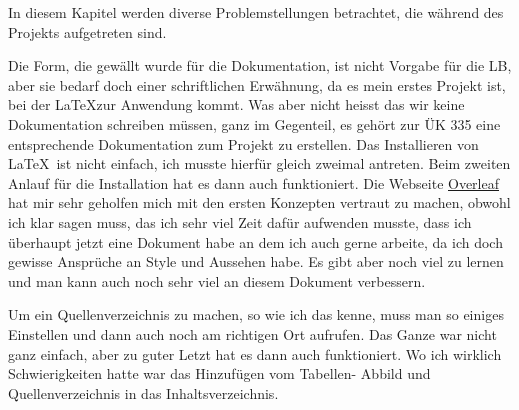 
\label{problemstellung}
In diesem Kapitel werden diverse Problemstellungen betrachtet, die während des Projekts aufgetreten sind.

Die Form, die gewällt wurde für die Dokumentation, ist nicht Vorgabe für die LB,
aber sie bedarf doch einer schriftlichen Erwähnung, da es mein erstes Projekt ist,
bei der \LaTeX zur Anwendung kommt. Was aber nicht heisst das wir keine Dokumentation schreiben
müssen, ganz im Gegenteil, es gehört zur ÜK 335 eine entsprechende Dokumentation
zum Projekt zu erstellen.\newline\newline
Das Installieren von \LaTeX~ist nicht einfach, ich musste hierfür gleich zweimal antreten.
Beim zweiten Anlauf für die Installation hat es dann auch funktioniert.
Die Webseite \href{https://www.overleaf.com}{Overleaf} hat mir sehr geholfen mich mit
den ersten Konzepten vertraut zu machen, obwohl ich klar sagen muss, das ich sehr viel
Zeit dafür aufwenden musste, dass ich überhaupt jetzt eine Dokument habe an dem ich auch
gerne arbeite, da ich doch gewisse Ansprüche an Style und Aussehen habe. Es gibt aber
noch viel zu lernen und man kann auch noch sehr viel an diesem Dokument verbessern.

Um ein Quellenverzeichnis zu machen, so wie ich das kenne, muss man so einiges Einstellen und
dann auch noch am richtigen Ort aufrufen. Das Ganze war nicht ganz einfach, aber zu guter Letzt
hat es dann auch funktioniert. Wo ich wirklich Schwierigkeiten hatte war das Hinzufügen vom
Tabellen- Abbild und Quellenverzeichnis in das Inhaltsverzeichnis.

